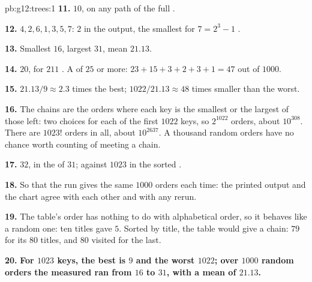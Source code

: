 \begin{solution}{pb:g12:trees:1}
\textbf{11.} $10$, on any path of the full .

\textbf{12.} $4, 2, 6, 1, 3, 5, 7$:  $2$ in the output, the smallest for $7 = 2^3 - 1$ .

\textbf{13.} Smallest $16$, largest $31$, mean $21.13$.

\textbf{14.} $20$, for $211$ . A  of $25$ or more: $23 + 15 + 3 + 2 + 3 + 1 = 47$  out of $1000$.

\textbf{15.} $21.13 / 9 \approx 2.3$ times the best; $1022 / 21.13 \approx 48$ times smaller than the worst.

\textbf{16.} The chains are the orders where each key is the smallest or the largest of those left: two choices for
each of the first $1022$ keys, so $2^{1022}$ orders, about $10^{308}$. There are $1023!$ orders in all, about
$10^{2637}$. A thousand random orders have no chance worth counting of meeting a chain.

\textbf{17.} $32$, in the  of  $31$; against $1023$ in the sorted .

\textbf{18.} So that the run gives the same $1000$ orders each time: the printed output and the chart agree with each
other and with any rerun.

\textbf{19.} The table's order has nothing to do with alphabetical order, so it behaves like a random one: ten titles
gave  $5$. Sorted by title, the table would give a chain:  $79$ for its $80$ titles, and $80$ 
visited for the last.

\textbf{20.} \textbf{For $1023$ keys, the best  is $9$ and the worst $1022$; over $1000$ random orders the
measured  ran from $16$ to $31$, with a mean of $21.13$.}
\end{solution}
